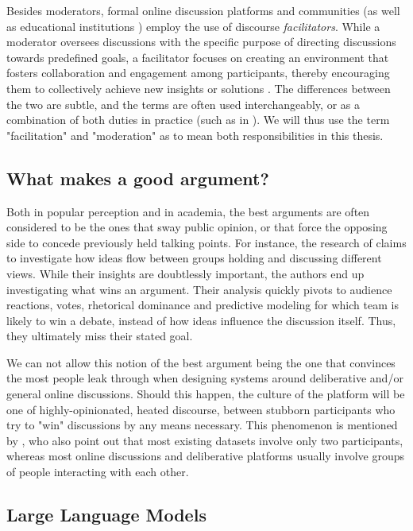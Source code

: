 Besides moderators, formal online discussion platforms and communities (as well as educational institutions \cite{Wang2008StudentfacilitatorsRI, Zhong2019ExploringTR}) employ the use of discourse \textit{facilitators}. While a moderator oversees discussions with the specific purpose of directing discussions towards predefined goals, a facilitator focuses on creating an environment that fosters collaboration and engagement among participants, thereby encouraging them to collectively achieve new insights or solutions \cite{wef_moderation}. The differences between the two are subtle, and the terms are often used interchangeably, or as a combination of both duties in practice (such as in \citet{Zhong2019ExploringTR, Carson2008}). We will thus use the term "facilitation" and "moderation" as to mean both responsibilities in this thesis. 

\subsection{What makes a good argument?}
\label{sec:background:good-argument}

Both in popular perception and in academia, the best arguments are often considered to be the ones that sway public opinion, or that force the opposing side to concede previously held talking points. For instance, the research of \citet{zhang2016-oxford} claims to investigate how ideas flow between groups holding and discussing different views. While their insights are doubtlessly important, the authors end up investigating what wins an argument. Their analysis quickly pivots to audience reactions, votes, rhetorical dominance and predictive modeling for which team is likely to win a debate, instead of how ideas influence the discussion itself. Thus, they ultimately miss their stated goal.

We can not allow this notion of the best argument being the one that convinces the most people leak through when designing systems around deliberative and/or general online discussions. Should this happen, the culture of the platform will be one of highly-opinionated, heated discourse, between stubborn participants who try to "win" discussions by any means necessary. This phenomenon is mentioned by \citet{karadzhov2023delidata}, who also point out that most existing datasets involve only two participants, whereas most online discussions and deliberative platforms usually involve groups of people interacting with each other. 


\subsection{Large Language Models}
\label{sec:background:llm}

